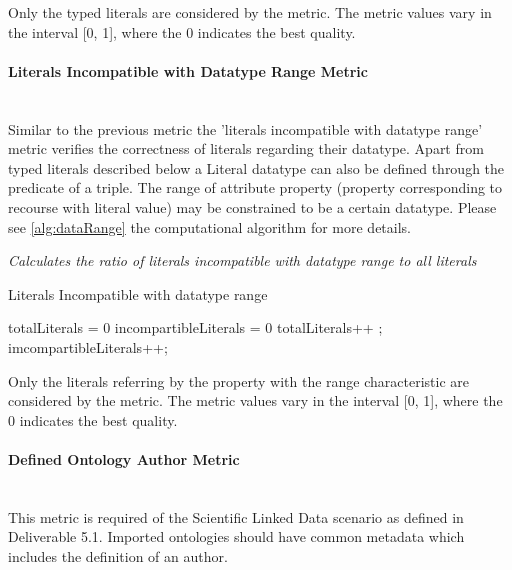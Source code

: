 Only the typed literals are considered by the metric. 
The metric values vary in the interval [0, 1], where the 0 indicates the best quality.



\paragraph{Literals Incompatible with Datatype Range Metric} ~\\ 
\label{par:incompartible}
Similar to the previous metric the 'literals incompatible with datatype range' metric verifies the correctness of literals regarding their datatype. 
Apart from typed literals described below a Literal datatype can also be defined through the predicate of a triple.
The range of attribute property (property corresponding to recourse with literal value) may be constrained to be a certain datatype.
Please see \ref{alg:dataRange} the computational algorithm for more details.

\begin{mdframed}[style=metricdefinition]
\emph{Calculates the ratio of literals incompatible with datatype range to all literals}
\end{mdframed}


\begin{algorithm}
\caption{Literals Incompatible with datatype range}\label{alg:dataRange}
\begin{algorithmic}[1]
\State totalLiterals = 0
\State incompartibleLiterals = 0
\EndProcedure
{}
 totalLiterals++ ;
 imcompartibleLiterals++; 
\EndIf
\EndIf
{}
\EndProcedure
\end{algorithmic}
\end{algorithm}

Only the literals referring by the property with the range characteristic are considered by the metric. 
The metric values vary in the interval [0, 1], where  the 0 indicates the best quality.


\paragraph{Defined Ontology Author Metric} ~\\ 
This metric is required of the Scientific Linked Data scenario as defined in Deliverable 5.1.
Imported ontologies should have common metadata which includes the definition of an author.

